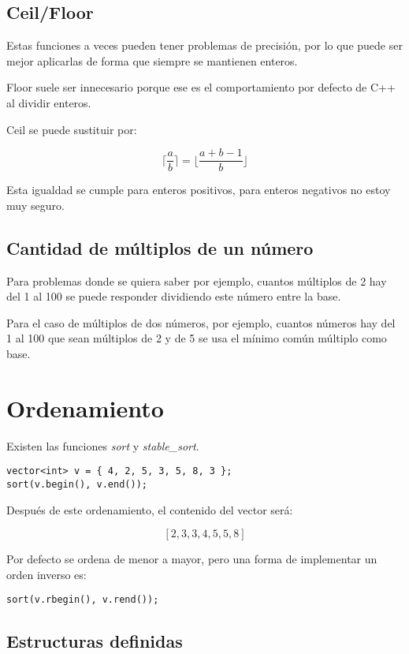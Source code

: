 \documentclass[10pt]{article}
\begin{document}
\subsection{Ceil/Floor}

Estas funciones a veces pueden tener problemas de precisión, por lo que puede ser mejor aplicarlas de forma que siempre se mantienen enteros.

Floor suele ser innecesario porque ese es el comportamiento por defecto de C++ al dividir enteros.

Ceil se puede sustituir por:

\[ \lceil \frac{a}{b} \rceil = \lfloor \frac{a + b - 1}{b} \rfloor \]

Esta igualdad se cumple para enteros positivos, para enteros negativos no estoy muy seguro.

\subsection{Cantidad de múltiplos de un número}

Para problemas donde se quiera saber por ejemplo, cuantos múltiplos de 2 hay del 1 al 100 se puede responder dividiendo este número entre la base.

Para el caso de múltiplos de dos números, por ejemplo, cuantos números hay del 1 al 100 que sean múltiplos de 2 y de 5 se usa el mínimo común múltiplo como base.

\section{Ordenamiento}

Existen las funciones \textit{sort} y \textit{stable\_sort}.

\begin{lstlisting}
vector<int> v = { 4, 2, 5, 3, 5, 8, 3 };
sort(v.begin(), v.end());
\end{lstlisting}

Después de este ordenamiento, el contenido del vector será:

\[ [ 2, 3, 3, 4, 5, 5, 8 ] \]

Por defecto se ordena de menor a mayor, pero una forma de implementar un orden inverso es:

\begin{lstlisting}
sort(v.rbegin(), v.rend());
\end{lstlisting}

\subsection{Estructuras definidas}
\end{document}
